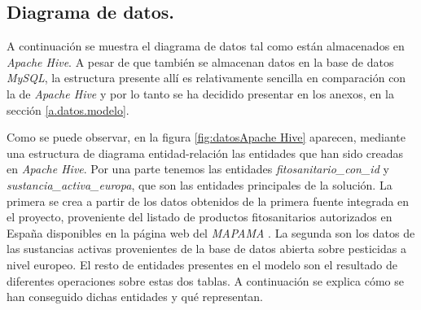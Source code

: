 \subsection{Diagrama de datos.} \label{disenyo.arquitectura.datos}
\par A continuación se muestra el diagrama de datos tal como están almacenados en \textit{Apache Hive}. A pesar de que también se almacenan datos en la base de datos \textit{MySQL}, la estructura presente allí es relativamente sencilla en comparación con la de \textit{Apache Hive} y por lo tanto se ha decidido presentar en los anexos, en la sección \ref{a.datos.modelo}. 
\par 
Como se puede observar, en la figura \ref{fig:datosApache Hive} aparecen, mediante una estructura de diagrama entidad-relación las entidades que han sido creadas en \textit{Apache Hive}. Por una parte tenemos las entidades \textit{fitosanitario\_con\_id} y \textit{sustancia\_activa\_europa}, que son las entidades principales de la solución. La primera se crea a partir de los datos obtenidos de la primera fuente integrada en el proyecto, proveniente del listado de productos fitosanitarios autorizados en España disponibles en la página web del \textit{MAPAMA} \cite{mapama}. La segunda son los datos de las sustancias activas provenientes de la base de datos abierta sobre pesticidas a nivel europeo. El resto de entidades presentes en el modelo son el resultado de diferentes operaciones sobre estas dos tablas. A continuación se explica cómo se han conseguido dichas entidades y qué representan. 
